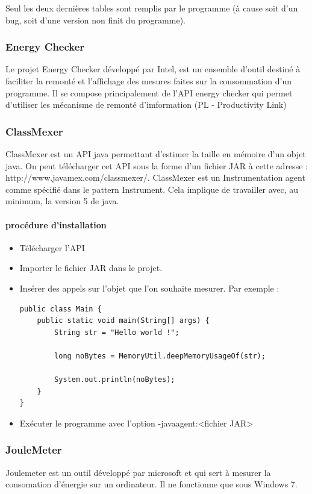 \documentclass[a4paper, 11pt]{report}
\begin{document}
Seul les deux dernières tables sont remplis par le programme (à cause soit d’un bug, soit d’une version non finit du programme).

\subsubsection{Energy Checker}
Le projet Energy Checker développé par Intel, est un ensemble d’outil destiné à faciliter la remonté et l’affichage des mesures faites sur la consommation d’un programme. Il se compose principalement de l’API energy checker qui permet d’utiliser les mécanisme de remonté d’imformation (PL - Productivity Link)

\subsubsection{ClassMexer}
ClassMexer est un API java permettant d’estimer la taille en mémoire d’un objet java. On peut télécharger cet API sous la forme d’un fichier JAR à cette adresse : http://www.javamex.com/classmexer/. ClassMexer est un Instrumentation agent comme spécifié dans le pattern Instrument. Cela implique de travailler avec, au minimum, la version 5 de java.

\paragraph{procédure d'installation}
\begin{itemize}
	\item Télécharger l’API
	\item Importer le fichier JAR dans le projet.
	\item Insérer des appels sur l’objet que l’on souhaite mesurer. Par exemple :
\begin{verbatim}
public class Main {
	public static void main(String[] args) {
		String str = "Hello world !";
		
		long noBytes = MemoryUtil.deepMemoryUsageOf(str);
		
		System.out.println(noBytes);
	}
}
\end{verbatim}
	\item Exécuter le programme avec l’option -javaagent:<fichier JAR>
\end{itemize}

\subsubsection{JouleMeter}
Joulemeter est un outil développé par microsoft et qui sert à mesurer la consomation d’énergie sur un ordinateur. Il ne fonctionne que sous Windows 7.
\end{document}
